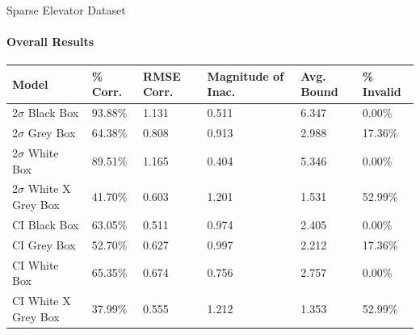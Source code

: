 \documentclass{beamer}
\begin{document}
\begin{frame}[t]{Sparse Elevator Dataset}
  \framesubtitle{Overall Results}

  \vspace*{-0.5cm}
  \begin{table}[htp!]
  \small
  \begin{tabular}{|p{2.5cm}|p{1.3cm}|p{1.0cm}|p{1.7cm}|p{1.0cm}|p{1.5cm}|}

    \hline
    \textbf{Model} &
    \textbf{\% Corr.} &
    \textbf{RMSE Corr.} &
    \textbf{Magnitude of Inac.} &
    \textbf{Avg. Bound} &
    \textbf{\% Invalid} \\
    \hline

    2$\sigma$ Black Box &
    93.88\% &
    1.131 &
    0.511 &
    6.347 &
    0.00\% \\
    \hline

    2$\sigma$ Grey Box &
    64.38\% &
    0.808 &
    0.913 &
    2.988 &
    17.36\% \\
    \hline

    2$\sigma$ White Box &
    89.51\% &
    1.165 &
    0.404 &
    5.346 &
    0.00\% \\
    \hline

    2$\sigma$ White X Grey Box &
    41.70\% &
    0.603 &
    1.201 &
    1.531 &
    52.99\% \\
    \hline

    CI Black Box &
    63.05\% &
    0.511 &
    0.974 &
    2.405 &
    0.00\% \\
    \hline

    CI Grey Box &
    52.70\% &
    0.627 &
    0.997 &
    2.212 &
    17.36\% \\
    \hline

    CI White Box &
    65.35\% &
    0.674 &
    0.756 &
    2.757 &
    0.00\% \\
    \hline

    CI White X Grey Box &
    37.99\% &
    0.555 &
    1.212 &
    1.353 &
    52.99\% \\
    \hline


\end{tabular}
\end{table}

\end{frame}
\end{document}
